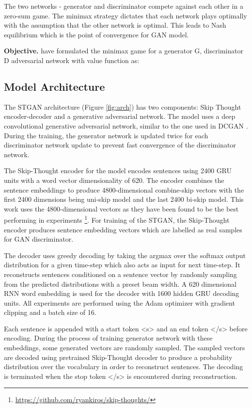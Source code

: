 \documentclass[11pt,a4paper]{article}
\begin{document}
The two networks - generator and discriminator compete against 
each other in a zero-sum game. The minimax strategy dictates that each
network plays optimally with the assumption that the other network is optimal. This 
leads to Nash equilibrium which is the point of convergence for GAN model.

\textbf{Objective.}
 have formulated the minimax game for a generator G,
discriminator D adversarial network with value function  as:


\subsection{Model Architecture}

The STGAN architecture (Figure \ref{fig:arch}) has two components: Skip Thought encoder-decoder and a generative adversarial network. The model uses a deep convolutional generative adversarial network, similar to the
one used in DCGAN \cite{dcgan}. During the training, the generator network is updated twice for each discriminator network update to prevent fast convergence of the discriminator network.

The Skip-Thought encoder for the model encodes sentences using 2400 GRU units \cite{gru} with a word vector dimensionality of 620. The encoder combines the sentence embeddings to produce 4800-dimensional combine-skip vectors with the first 2400 dimensions being uni-skip model and the last 2400 bi-skip model. This work uses the 4800-dimensional vectors as they have been found to be the best performing in experiments \footnote{\url{https://github.com/ryankiros/skip-thoughts/}}. For training of the STGAN, the Skip-Thought encoder produces sentence embedding vectors which are labelled as real samples for GAN discriminator.

The decoder uses greedy decoding by taking the argmax over the softmax output distribution for a given time-step which also acts as input for next time-step. It reconstructs sentences conditioned on a sentence vector by randomly sampling from the predicted distributions with a preset beam width. A 620 dimensional RNN word embedding is used for the decoder with 1600 hidden GRU decoding units. All experiments are performed using the Adam optimizer \cite{adam} with gradient clipping and a batch size of 16.

Each sentence is appended with a start token \textless s\textgreater \hspace{0.1cm}  and an end token \textless/s\textgreater  \hspace{0.1cm} before encoding. 
During the process of training generator network with these embeddings, some generated vectors are randomly sampled. The sampled vectors are decoded using pretrained Skip-Thought decoder to produce a probability distribution over the vocabulary in order to reconstruct sentences. The decoding is terminated when the stop token \textless/s\textgreater \hspace{0.1cm} is encountered during reconstruction.
\end{document}
